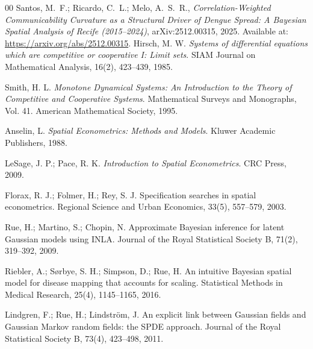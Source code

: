 \documentclass[final,3p,times,twocolumn]{elsarticle}
\begin{document}
\begin{thebibliography}{00}
Santos, M.\ F.; Ricardo, C.\ L.; Melo, A.\ S.\ R.,
\textit{Correlation-Weighted Communicability Curvature as a Structural Driver of Dengue Spread: A Bayesian Spatial Analysis of Recife (2015--2024)},
arXiv:2512.00315, 2025.
Available at: \url{https://arxiv.org/abs/2512.00315}.
Hirsch, M. W.
\textit{Systems of differential equations which are competitive or cooperative I: Limit sets}.
SIAM Journal on Mathematical Analysis, 16(2), 423--439, 1985.

Smith, H. L.
\textit{Monotone Dynamical Systems: An Introduction to the Theory of Competitive and Cooperative Systems}.
Mathematical Surveys and Monographs, Vol. 41. American Mathematical Society, 1995.


Anselin, L.
\textit{Spatial Econometrics: Methods and Models}.
Kluwer Academic Publishers, 1988.

LeSage, J. P.; Pace, R. K.
\textit{Introduction to Spatial Econometrics}.
CRC Press, 2009.

Florax, R. J.; Folmer, H.; Rey, S. J.
Specification searches in spatial econometrics.
Regional Science and Urban Economics, 33(5), 557--579, 2003.

Rue, H.; Martino, S.; Chopin, N.
Approximate Bayesian inference for latent Gaussian models using INLA.
Journal of the Royal Statistical Society B, 71(2), 319--392, 2009.

Riebler, A.; Sørbye, S. H.; Simpson, D.; Rue, H.
An intuitive Bayesian spatial model for disease mapping that accounts for scaling.
Statistical Methods in Medical Research, 25(4), 1145--1165, 2016.

Lindgren, F.; Rue, H.; Lindström, J.
An explicit link between Gaussian fields and Gaussian Markov random fields: the SPDE approach.
Journal of the Royal Statistical Society B, 73(4), 423--498, 2011.

\end{thebibliography}
\end{document}
